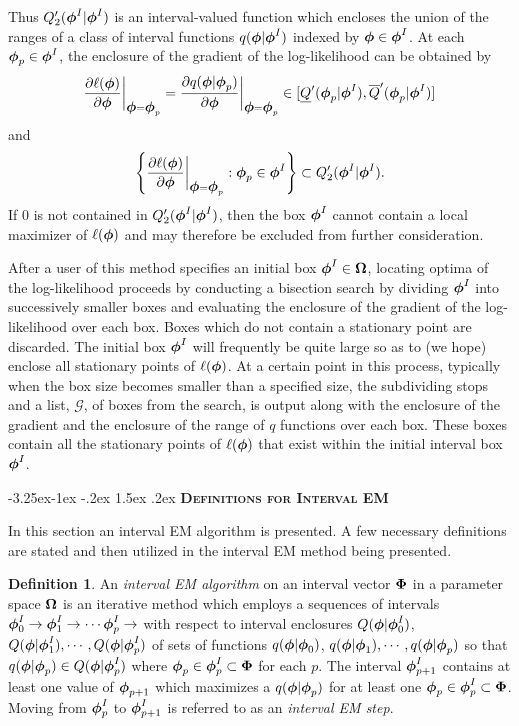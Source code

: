 \documentclass[10pt,twoside]{article}
\makeatletter
\renewcommand\subsection{\@startsection{subsection}{2}{\z@}%
                 {-3.25ex\@plus -1ex \@minus -.2ex}%
                 {1.5ex \@plus .2ex}%
                 {\scshape\centering\bfseries}} %
\makeatother
\begin{document}
Thus $Q'_2(\mbox{\boldmath $\phi$}^I | \mbox{\boldmath $\phi$}^I)$ is an interval-valued function which
encloses the union of the ranges of a class of interval 
functions $q(\mbox{\boldmath $\phi$}|\mbox{\boldmath $\phi$}^I)$
indexed by $\mbox{\boldmath $\phi$} \in \mbox{\boldmath $\phi$}^I$.
At each $\mbox{\boldmath $\phi$}_p \in \mbox{\boldmath $\phi$}^I$, the enclosure of the gradient of the
log-likelihood can be obtained by 
$$
\frac{\partial \ell(\mbox{\boldmath $\phi$})}{\partial \mbox{\boldmath $\phi$}} \bigg| _{\mbox{\boldmath $\phi$}=\mbox{\boldmath $\phi$}_p} 
= \frac{\partial q(\mbox{\boldmath $\phi$}|\mbox{\boldmath $\phi$}_p)}{\partial \mbox{\boldmath $\phi$}} \bigg|
_{\mbox{\boldmath $\phi$}=\mbox{\boldmath $\phi$}_p} 
\in
[\underline{Q}'(\mbox{\boldmath $\phi$}_p | \mbox{\boldmath $\phi$}^I), \overline{Q}'(\mbox{\boldmath $\phi$}_p | \mbox{\boldmath $\phi$}^I)]
$$
and
$$
\left\{ \frac{\partial\ell(\mbox{\boldmath $\phi$})}{\partial\mbox{\boldmath $\phi$}} 
  \bigg|_{\mbox{\boldmath $\phi$} = \mbox{\boldmath $\phi$}_p} : \mbox{\boldmath $\phi$}_p \in \mbox{\boldmath $\phi$}^I \right\}
\subset Q'_2(\mbox{\boldmath $\phi$}^I | \mbox{\boldmath $\phi$}^I).
$$
If $0$ is not contained in  $Q'_2(\mbox{\boldmath $\phi$}^I | \mbox{\boldmath $\phi$}^I)$,
then the box 
$\mbox{\boldmath $\phi$}^I$ cannot contain a local maximizer of $\ell(\mbox{\boldmath $\phi$})$ and may
therefore
be excluded from further consideration.

After a user of this method specifies an initial box $\mbox{\boldmath $\phi$}^I
\in \mbox{\boldmath $\Omega$}$, locating optima of the log-likelihood proceeds by
conducting a bisection search by 
dividing $\mbox{\boldmath $\phi$}^I$ into successively smaller boxes and evaluating the
enclosure of the gradient of the log-likelihood over each box.  Boxes which
do not contain a stationary point are discarded.  The initial box $\mbox{\boldmath $\phi$}^I$
will frequently be quite large so as to (we hope) enclose all stationary
points of $\ell(\mbox{\boldmath $\phi$})$.
At a certain
point in this process, 
typically when the box size becomes smaller than a specified size, 
the subdividing stops and a list, $\mathcal{G}$,  
of boxes from the search,
is output along with the enclosure of the gradient
and the enclosure of the range of $q$ functions over each box.  These boxes
contain all the stationary points of $\ell(\mbox{\boldmath $\phi$})$ that exist within the
initial interval box $\mbox{\boldmath $\phi$}^I$.

\subsection{\textsc \bf Definitions for Interval EM}

In this section an interval EM algorithm is presented.
A few necessary definitions are stated and then utilized in the interval EM
method being presented.

{\bf Definition 1}.  An {\it interval EM algorithm}
on an interval vector $\mbox{\boldmath $\Phi$}$ in a parameter space $\mbox{\boldmath $\Omega$}$ is an
iterative
method which employs a sequences of intervals
$\mbox{\boldmath $\phi$}^I_0 \rightarrow  \mbox{\boldmath $\phi$}^I_1 \rightarrow  \cdots \mbox{\boldmath $\phi$}^I_p
\rightarrow$
with respect to interval enclosures 
$Q(\mbox{\boldmath $\phi$} | {\mbox{\boldmath $\phi$}}^I_0)$, $Q(\mbox{\boldmath $\phi$} | {\mbox{\boldmath $\phi$}}^I_1), \cdots,
Q(\mbox{\boldmath $\phi$} | {\mbox{\boldmath $\phi$}}^I_p)$
of sets of functions 
$q(\mbox{\boldmath $\phi$} | \mbox{\boldmath $\phi$}_0)$, $q(\mbox{\boldmath $\phi$} | \mbox{\boldmath $\phi$}_1), \cdots, 
q(\mbox{\boldmath $\phi$} | \mbox{\boldmath $\phi$}_p)$ so that 
$q(\mbox{\boldmath $\phi$} | \mbox{\boldmath $\phi$}_p) \in Q(\mbox{\boldmath $\phi$} | \mbox{\boldmath $\phi$}^I_p)$ where 
$\mbox{\boldmath $\phi$}_p \in \mbox{\boldmath $\phi$}^I_p \subset \mbox{\boldmath $\Phi$}$
for each $p$.  The interval $\mbox{\boldmath $\phi$}^I_{p+1}$ contains at least one value of
$\mbox{\boldmath $\phi$}_{p+1}$ which maximizes a $q(\mbox{\boldmath $\phi$} | \mbox{\boldmath $\phi$}_p)$ for at least one
$ \mbox{\boldmath $\phi$}_p \in \mbox{\boldmath $\phi$}^I_p \subset \mbox{\boldmath $\Phi$}$.
Moving from $\mbox{\boldmath $\phi$}_p^I$ to $\mbox{\boldmath $\phi$}_{p+1}^I$ 
is referred to
as an {\it interval EM step}.
\end{document}
